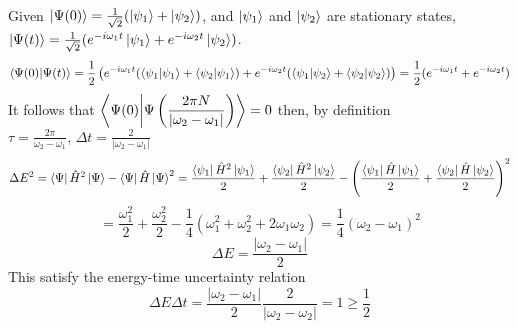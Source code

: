 \begin{sol}
Given $\ket{\Psi(0)}=\frac{1}{\sqrt{2}}(\ket{\psi_1}+\ket{\psi_2})$, and $\ket{\psi_1}$ and $\ket{\psi_2}$ are stationary states, $\ket{\Psi(t)}=\frac{1}{\sqrt{2}}(e^{-i\omega_1t}\ket{\psi_1}+e^{-i\omega_2t}\ket{\psi_2})$.
\begin{equation}
	\braket{\Psi(0)}{\Psi(t)}=\frac{1}{2}\left(e^{-i\omega_1t}(\braket{\psi_1}{\psi_1}+\braket{\psi_2}{\psi_1})+e^{-i\omega_2t}(\braket{\psi_1}{\psi_2}+\braket{\psi_2}{\psi_2})\right)=\frac{1}{2}(e^{-i\omega_1t}+e^{-i\omega_2t})
\end{equation} 
It follows that $\displaystyle{\braket{\Psi(0)}{\Psi\left(\frac{2\pi N}{|\omega_2-\omega_1|}\right)}=0}$ then, by definition $\displaystyle{\tau=\frac{2\pi}{\omega_2-\omega_1},\,\Delta t=\frac{2}{|\omega_2-\omega_1|}}$
\begin{equation}
	\Delta E^2=\bra\Psi\hat H^2\ket\Psi-\bra\Psi\hat H\ket\Psi^2=\frac{\bra{\psi_1}\hat H^2\ket{\psi_1}}{2}+\frac{\bra{\psi_2}\hat H^2\ket{\psi_2}}{2}-\left(\frac{\bra{\psi_1}\hat H\ket{\psi_1}}{2}+\frac{\bra{\psi_2}\hat H\ket{\psi_2}}{2}\right)^2
\end{equation}
\begin{equation}
	=\frac{\omega_1^2}{2}+\frac{\omega_2^2}{2}-\frac{1}{4}(\omega_1^2+\omega_2^2+2\omega_1\omega_2)=\frac{1}{4}(\omega_2-\omega_1)^2
\end{equation}
\begin{equation}
	\Delta E=\frac{|\omega_2-\omega_1|}{2}
\end{equation}
This satisfy the energy-time uncertainty relation 
\begin{equation}
	\Delta E\Delta t=\frac{|\omega_2-\omega_1|}{2}\frac{2}{|\omega_2-\omega_2|}=1\geq \frac{1}{2}
\end{equation}
\end{sol}